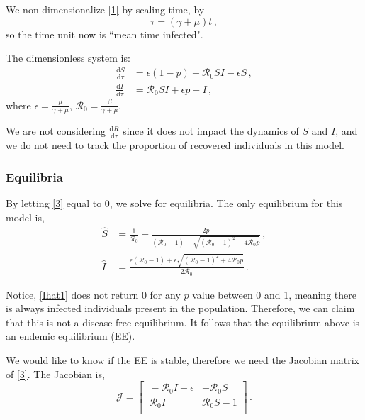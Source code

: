 \documentclass[12pt]{article}
\newcommand\dbyd[2]{\frac{\mathrm d{#1}}{\mathrm d{#2}}}
\newcommand{\R}{\mathcal{R}}
\begin{document}
We non-dimensionalize \autoref{1} by scaling time, by
\begin{equation}
\tau=(\gamma+\mu)t \,,
\end{equation}
so the time unit now is ``mean time infected".

The dimensionless system is:
\begin{subequations}\label{3}
\begin{align}
\dbyd{S}{\tau}&=\epsilon(1-p)- \R_0  SI-\epsilon S \,,\\
\dbyd{I}{\tau}&=\R_0 SI+\epsilon p-I \,,
\end{align}
\end{subequations}
where $\epsilon=\frac{\mu}{\gamma+\mu}$, $\R_0=\frac{\beta}{\gamma+\mu}$.

We are not considering $\dbyd{R}{\tau}$ since it does not impact the dynamics of $S$ and $I$, and we do not need to track the proportion of recovered individuals in this model.
\subsubsection{Equilibria}
By letting \autoref{3} equal to 0, we solve for equilibria. The only equilibrium for this model is,
\begin{subequations}
\begin{align}
\hat{S} &=\frac{1}{\R_0}-\frac{2p}{(\R_0 -1)+ \sqrt{(\R_0-1)^2+4\R_0 p}}\,, \label{Shat1}\\
\hat{I} &= \frac{\epsilon(\R_0 -1)+ \epsilon \sqrt{(\R_0-1)^2+4\R_0
    p}}{2\R_0}\,.\label{Ihat1}
\end{align}
\end{subequations}

Notice, \autoref{Ihat1} does not return 0 for any $p$ value between 0 and 1, meaning there is always infected individuals present in the population. Therefore, we can claim that this is not a disease free equilibrium. It follows that the equilibrium above is an endemic equilibrium (EE).

We would like to know if the EE is stable, therefore we need the Jacobian matrix of \autoref{3}. The Jacobian is, 
\begin{equation}
\mathcal{J} =
\begin{bmatrix}
    \ -\R_0 I-\epsilon       & -\R_0 S \\
    \ \R_0 I       & \R_0 S-1 \\
\end{bmatrix} \,.
\end{equation}
\end{document}
